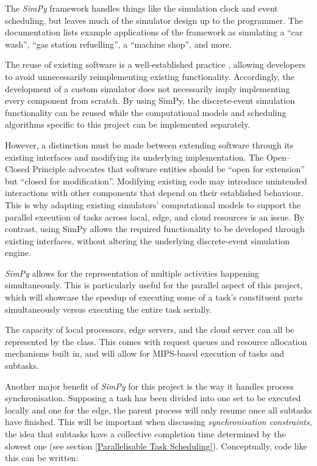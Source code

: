 \documentclass[]{UCD_CS_FYP_Report}
\begin{document}
The \textit{SimPy} framework handles things like the simulation clock and event scheduling, but leaves much of the simulator design up to the programmer. The documentation lists example applications of the framework as simulating a \enquote{car wash}, \enquote{gas station refuelling}, a \enquote{machine shop}, and more.

The reuse of existing software is a well-established practice \cite{meyer1997oosc}, allowing developers to avoid unnecessarily reimplementing existing functionality. Accordingly, the development of a custom simulator does not necessarily imply implementing every component from scratch. By using SimPy, the discrete-event simulation functionality can be reused while the computational models and scheduling algorithms specific to this project can be implemented separately.

However, a distinction must be made between extending software through its existing interfaces and modifying its underlying implementation. The Open–Closed Principle \cite{meyer1997oosc} advocates that software entities should be \enquote{open for extension} but \enquote{closed for modification}. Modifying existing code may introduce unintended interactions with other components that depend on their established behaviour. This is why adapting existing simulators' computational models to support the parallel execution of tasks across local, edge, and cloud resources is an issue. By contrast, using SimPy allows the required functionality to be developed through existing interfaces, without altering the underlying discrete-event simulation engine.

\textit{SimPy} allows for the representation of multiple activities happening simultaneously. This is particularly useful for the parallel aspect of this project, which will showcase the speedup of executing some of a task's constituent parts simultaneously versus executing the entire task serially.

The capacity of local processors, edge servers, and the cloud server can all be represented by the  class. This comes with request queues and resource allocation mechanisms built in, and will allow for MIPS-based execution of tasks and subtasks.

Another major benefit of \textit{SimPy} for this project is the way it handles process synchronisation. Supposing a task has been divided into one set to be executed locally and one for the edge, the parent process will only resume once all subtasks have finished. This will be important when discussing \textit{synchronisation constraints}, the idea that subtasks have a collective completion time determined by the slowest one (see section \ref{Parallelisable Task Scheduling}). Conceptually, code like this can be written:
\end{document}
